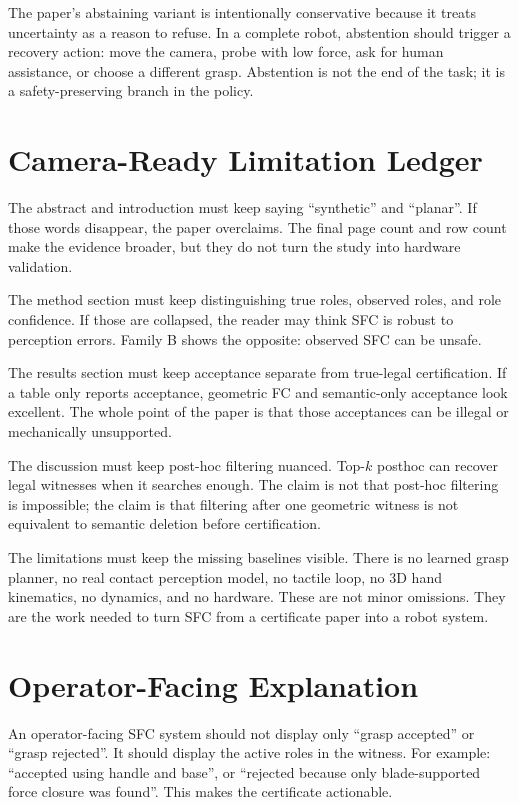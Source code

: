 \documentclass{article}
\begin{document}
The paper's abstaining variant is intentionally conservative because it treats uncertainty as a reason to refuse. In a complete robot, abstention should trigger a recovery action: move the camera, probe with low force, ask for human assistance, or choose a different grasp. Abstention is not the end of the task; it is a safety-preserving branch in the policy.

\section{Camera-Ready Limitation Ledger}

The abstract and introduction must keep saying ``synthetic'' and ``planar''. If those words disappear, the paper overclaims. The final page count and row count make the evidence broader, but they do not turn the study into hardware validation.

The method section must keep distinguishing true roles, observed roles, and role confidence. If those are collapsed, the reader may think SFC is robust to perception errors. Family B shows the opposite: observed SFC can be unsafe.

The results section must keep acceptance separate from true-legal certification. If a table only reports acceptance, geometric FC and semantic-only acceptance look excellent. The whole point of the paper is that those acceptances can be illegal or mechanically unsupported.

The discussion must keep post-hoc filtering nuanced. Top-\(k\) posthoc can recover legal witnesses when it searches enough. The claim is not that post-hoc filtering is impossible; the claim is that filtering after one geometric witness is not equivalent to semantic deletion before certification.

The limitations must keep the missing baselines visible. There is no learned grasp planner, no real contact perception model, no tactile loop, no 3D hand kinematics, no dynamics, and no hardware. These are not minor omissions. They are the work needed to turn SFC from a certificate paper into a robot system.

\section{Operator-Facing Explanation}

An operator-facing SFC system should not display only ``grasp accepted'' or ``grasp rejected''. It should display the active roles in the witness. For example: ``accepted using handle and base'', or ``rejected because only blade-supported force closure was found''. This makes the certificate actionable.
\end{document}
